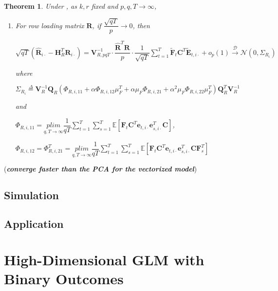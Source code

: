 \documentclass{article}[12pt]
\newtheorem{theorem}{Theorem}
\begin{document}
\begin{theorem}
    \normalfont Under  , as $k,r$ fixed and $p,q,T \rightarrow \infty$,
    \begin{enumerate}
        \item For row loading matrix $\mathbf{R}$, if $\dfrac{\sqrt{qT}}{p} \rightarrow 0$, then
        
        $\sqrt{qT}(\mathbf{\widehat{R}}_{i\cdot}-\mathbf{H}_R^T\mathbf{R}_{i\cdot}) = \mathbf{V}_{R,pqT}^{-1}\cdot \dfrac{\mathbf{\widehat{R}}^T\mathbf{R}}{p}\cdot \dfrac{1}{\sqrt{qT}}\sum\limits_{t=1}^T\mathbf{\widetilde{F}}_t\mathbf{C}^T\mathbf{\widetilde{E}}_{t,i\cdot}+o_p(1) \xrightarrow{\mathcal{D}} \mathcal{N}(0,\Sigma_{R_i})$
        
        where             

        $\Sigma_{R_i}  \overset{\Delta}{=} \mathbf{V}_R^{-1}\mathbf{Q}_R(\Phi_{R,i,11}+\alpha\Phi_{R,i,12}\mu_F^T+\alpha\mu_F\Phi_{R,i,21}+\alpha^2\mu_F\Phi_{R,i,22}\mu_F^T)\mathbf{Q}_R^T\mathbf{V}_R^{-1}$

        and 

        $\Phi_{R,i,11} = \underset{q,T \rightarrow \infty}{plim}\dfrac{1}{qT}\sum\limits_{t=1}^T\sum\limits_{s=1}^T\mathbb{E}\left[\mathbf{F}_t\mathbf{C}^T\mathbf{e}_{t,i\cdot}\mathbf{e}_{s,i\cdot}^T\mathbf{C}\right]$,

        $\Phi_{R,i,12} = \Phi_{R,i,21}^T = \underset{q,T \rightarrow \infty}{plim}\dfrac{1}{qT}\sum\limits_{t=1}^T\sum\limits_{s=1}^T\mathbb{E}\left[\mathbf{F}_t\mathbf{C}^T\mathbf{e}_{t,i\cdot}\mathbf{e}_{s,i\cdot}^T\mathbf{C}\mathbf{F}_s^T\right]$


    \end{enumerate}
\end{theorem}
\noindent (\textbf{\textit{converge faster than the PCA for the vectorized model}})

\subsection{Simulation}

\subsection{Application}

\section{High-Dimensional GLM with Binary Outcomes}
\end{document}
